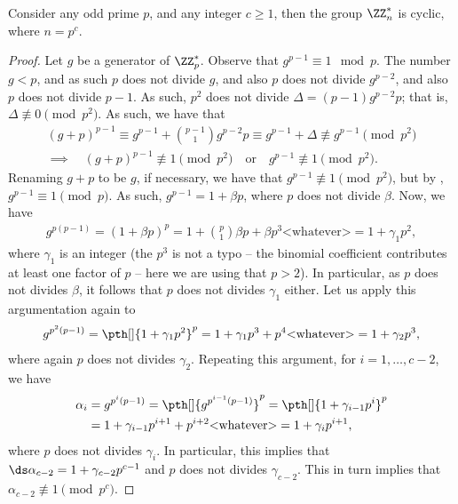 \begin{lemma}
    Consider any odd prime $p$, and any integer $c \geq 1$, then the
    group $\ZZ_n^*$ is cyclic, where $n=p^c$.
\end{lemma}
\begin{proof}
    Let $g$ be a generator of $\ZZ_p^*$. Observe that $g^{p-1} \equiv
    1 \mod p$. The number $g <p$, and as such $p$ does not divide $g$,
    and also $p$ does not divide $g^{p-2}$, and also $p$ does not
    divide $p-1$. As such, $p^2$ does not divide $\Delta =
    (p-1)g^{p-2}p$; that is, $\Delta \nequiv 0 \pmod{p^2}$. As such,
    we have that 
    \begin{align*}
        (g+p)^{p-1} \equiv g^{p-1} + \binom{p-1}{1} g^{p-2} p \equiv
        g^{p-1} + \Delta \nequiv g^{p-1} \pmod{p^2}\\
        \implies\quad%
        (g+p)^{p-1} \nequiv 1 \pmod{p^2}%
        \quad \text{or}\quad%
        g^{p-1} \nequiv 1 \pmod{p^2}.
    \end{align*}
    Renaming $g+p$ to be $g$, if necessary, we have that %
    $g^{p-1} \nequiv 1 \pmod{p^2}$, but by ,
    $g^{p-1} \equiv 1 \pmod{p}$. As such, $g^{p-1} = 1 +\beta p$,
    where $p$ does not divide $\beta$. Now, we have 
    \begin{align*}
        g^{p(p-1)} = (1+\beta p)^p = 1 + \binom{p}{1} \beta p + \beta
        p^3 \text{<whatever>}%
        =%
        1 + \gamma_1 p^2,
    \end{align*}
    where $\gamma_1$ is an integer (the $p^3$ is not a typo -- the
    binomial coefficient contributes at least one factor of $p$ --
    here we are using that $p >2$). In particular, as $p$ does not
    divides $\beta$, it follows that $p$ does not divides $\gamma_1$
    either. Let us apply this argumentation again to 
    \begin{align*}
        g^{p^2(p-1)}%
        =%
        \pth[]{1+\gamma_1 p^2}^p = 1 +\gamma_1 p^3 + p^4
        \text{<whatever>}%
        =%
        1 + \gamma_2 p^3,
    \end{align*}
    where again $p$ does not divides $\gamma_2$. Repeating this
    argument, for $i=1,\ldots, c-2$, we have
    \begin{align*}
        \alpha_i%
        &=%
        g^{p^i(p-1)}%
        =%
        \pth[]{g^{p^{i-1}(p-1)}}^p%
        =%
        \pth[]{1+\gamma_{i-1} p^{i}}^p\\
        &=%
        1 + \gamma_{i-1} p^{i+1} + p^{i+2} \text{<whatever>}%
        =%
        1 + \gamma_i p^{i+1},
    \end{align*}
    where $p$ does not divides $\gamma_i$. In particular, this implies
    that 
    \begin{math}
        \ds%
        \alpha_{c-2} =%
        1 + \gamma_{c-2} p^{c-1}
    \end{math}
    and $p$ does not divides $\gamma_{c-2}$. This in turn implies that
    $\alpha_{c-2} \nequiv 1 \pmod{p^{c}}$. 


\end{proof}
